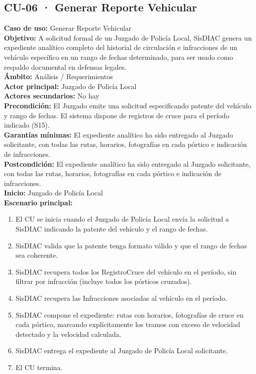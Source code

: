 \documentclass[12pt,letterpaper]{article}
\begin{document}
\newpage
\subsection{CU-06 · Generar Reporte Vehicular}

\noindent \textbf{Caso de uso:} Generar Reporte Vehicular \\
\textbf{Objetivo:} A solicitud formal de un Juzgado de Policía Local, SisDIAC genera un expediente analítico completo del historial de circulación e infracciones de un vehículo específico en un rango de fechas determinado, para ser usado como respaldo documental en defensas legales. \\
\textbf{Ámbito:} Análisis / Requerimientos \\
\textbf{Actor principal:} Juzgado de Policía Local \\
\textbf{Actores secundarios:} No hay\\
\textbf{Precondición:} El Juzgado emite una solicitud especificando patente del vehículo y rango de fechas. El sistema dispone de registros de cruce para el período indicado (S15). \\
\textbf{Garantías mínimas:} El expediente analítico ha sido entregado al Juzgado solicitante, con todas las rutas, horarios, fotografías en cada pórtico e indicación de infracciones. \\
\textbf{Postcondición:} El expediente analítico ha sido entregado al Juzgado solicitante, con todas las rutas, horarios, fotografías en cada pórtico e indicación de infracciones. \\
\textbf{Inicio:} Juzgado de Policía Local \\

\noindent \textbf{Escenario principal:}
\begin{enumerate}[nosep, leftmargin=*]
	\item El CU se inicia cuando el Juzgado de Policía Local envía la solicitud a SisDIAC indicando la patente del vehículo y el rango de fechas.
	\item SisDIAC valida que la patente tenga formato válido y que el rango de fechas sea coherente.
	\item SisDIAC recupera todos los RegistroCruce del vehículo en el período, sin filtrar por infracción (incluye todos los pórticos cruzados).
	\item SisDIAC recupera las Infracciones asociadas al vehículo en el período.
	\item SisDIAC compone el expediente: rutas con horarios, fotografías de cruce en cada pórtico, marcando explícitamente los tramos con exceso de velocidad detectado y la velocidad calculada.
	\item SisDIAC entrega el expediente al Juzgado de Policía Local solicitante.
	\item El CU termina.
\end{enumerate}
\end{document}
